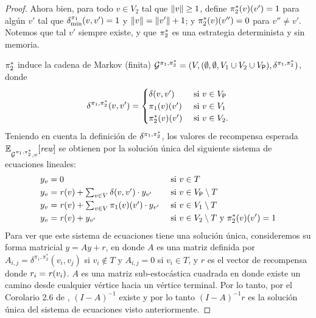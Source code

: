 \begin{proof}
  Ahora bien,  para todo $v\in V_2$
  tal que ${\lVert{v}\rVert} \geq 1$, define $\pi^*_{2}(v)(v')=1$
  para algún $v'$ tal que $\delta^{\pi_{1}}_{\min}(v,v')=1$ y
  ${\lVert{v}\rVert}={\lVert{v'}\rVert}+1$; y $\pi^*_{2}(v)(v'')=0$ para $v''\neq v'$.  Notemos que tal $v'$ siempre existe,
  y que $\pi^*_{2}$ es una estrategia determinista y sin memoria.

  $\pi^*_{2}$ induce la cadena de Markov (finita)
  $\mathcal{G}^{\pi_{1},\pi^*_{2}} = (V, (\emptyset,\emptyset,V_1\cup V_2\cup V_{\mathsf{P}}),\delta^{\pi_{1},\pi^*_{2}})$,
  donde
  \[\delta^{\pi_{1},\pi^*_{2}}(v,v') =
    \begin{cases}
      \delta(v,v')     & \text{ si } v\in V_{\mathsf{P}} \\
      \pi_{1}(v)(v') & \text{ si } v\in V_1 \\
      \pi^*_{2}(v)(v') & \text{ si } v\in V_2.
    \end{cases}
  \]
  Teniendo en cuenta la definición de $\delta^{\pi_{1},\pi^*_{2}}$,
  los valores de recompensa esperada
  $\mathbb{E}^{}_{\mathcal{G}^{\pi_{1},\pi^*_{2}},v}[\textit{rew}]$ se obtienen
  por la solución única del siguiente sistema de ecuaciones lineales:
  \begin{align*}
    y_v = {} & 0 && \text{ si } v\in T \\
    y_v = {} &\textstyle \mathit{r}(v) + \sum_{v\in V} \delta(v,v') \cdot y_{v'} && \text{ si } v\in V_{\mathsf{P}} \setminus T\\
    y_v = {} &\textstyle \mathit{r}(v) + \sum_{v\in V} \pi_{1}(v)(v') \cdot y_{v'}  && \text{ si } v\in V_1 \setminus T\\
    y_v = {} & \mathit{r}(v) +  y_{v'} && \text{ si } v\in V_2 \setminus T \text{ y } \pi^*_{2}(v)(v') = 1
  \end{align*}
  Para ver que este sistema de ecuaciones tiene una solución única, consideremos su forma matricial $y = Ay+ r$, en donde $A$ es una matriz definida por
  $A_{i,j} = \delta^{\pi_1,\pi^*_2}(v_i,v_j)$ si $v_i \notin T$ y
  $A_{i,j} = 0$ si $v_i \in T$, y $r$ es el vector de recompensa donde
  $r_i = \mathit{r}(v_i)$.
  $A$ es una matriz sub-estocástica cuadrada \cite{DBLP:journals/moc/Azimzadeh19} en donde existe un camino desde cualquier vértice hacia un vértice terminal.
  Por lo tanto, por el Corolario 2.6 de \cite{DBLP:journals/moc/Azimzadeh19},
  $(I-A)^{-1}$ existe y por lo tanto $(I-A)^{-1} r$ es la solución única del sistema de ecuaciones visto anteriormente.


\end{proof}
